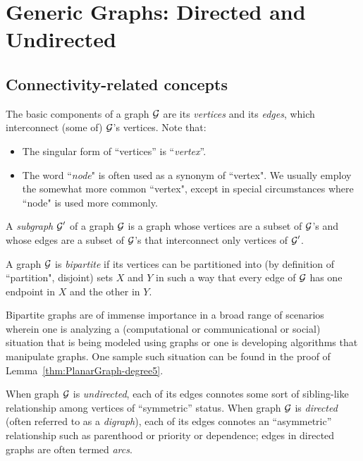 \section{Generic Graphs: Directed and Undirected}
\label{sec:graphs-generic}
\label{sec:basic-graphs}

\subsection{Connectivity-related concepts}
\label{sec:connectivity-notions}

The basic components of a graph $\mbox{$\cal G$}$ are its {\it vertices} and its {\it edges}, which interconnect
(some of) $\mbox{$\cal G$}$'s vertices.  Note that:
\begin{itemize}
\item
The singular form of ``vertices'' is ``{\it vertex}''.
\item
The word ``{\it node}" is often used as a synonym of ``vertex".  We usually employ the
somewhat more common ``vertex", except in special circumstances where ``node" is used
more commonly.
\end{itemize}
A {\it subgraph} $\mbox{$\cal G$}'$ of a graph $\mbox{$\cal G$}$ is a graph whose vertices are a subset of $\mbox{$\cal G$}$'s and
whose edges are a subset of $\mbox{$\cal G$}$'s that interconnect only vertices of $\mbox{$\cal G$}'$. 

\medskip

A graph $\mbox{$\cal G$}$ is {\em bipartite} if its vertices can be partitioned into (by definition of
``partition", disjoint) sets $X$ and $Y$ in such a way that every edge of $\mbox{$\cal G$}$ has one
endpoint in $X$ and the other in $Y$.

Bipartite graphs are of immense importance in a broad range of scenarios wherein one is 
analyzing a (computational or communicational or social) situation that is being modeled using
graphs or one is developing algorithms that manipulate graphs.  One sample such situation
can be found in the proof of Lemma~\ref{thm:PlanarGraph-degree5}.

\medskip

When graph $\mbox{$\cal G$}$ is {\em undirected},  each of
its edges connotes some sort of sibling-like relationship among vertices
of ``symmetric'' status.  When graph $\mbox{$\cal G$}$ is {\em directed}
 (often referred to as a {\em digraph}),
  each of its edges connotes an
``asymmetric'' relationship such as parenthood or priority or dependence;
edges in directed graphs are often termed {\em
  arcs}.  

